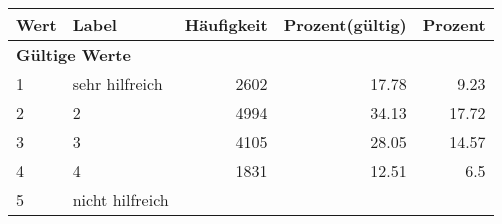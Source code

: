      \begin{longtable}{lXrrr}
     \toprule
     \textbf{Wert} & \textbf{Label} & \textbf{Häufigkeit} & \textbf{Prozent(gültig)} & \textbf{Prozent} \\
     \endhead
     \midrule
     \multicolumn{5}{l}{\textbf{Gültige Werte}}\\

     1 &
     \multicolumn{1}{X}{ sehr hilfreich   } &


       \num{2602} &
       \num[round-mode=places,round-precision=2]{17,78} &
         \num[round-mode=places,round-precision=2]{9,23} \\

     2 &
     \multicolumn{1}{X}{ 2   } &


       \num{4994} &
       \num[round-mode=places,round-precision=2]{34,13} &
         \num[round-mode=places,round-precision=2]{17,72} \\

     3 &
     \multicolumn{1}{X}{ 3   } &


       \num{4105} &
       \num[round-mode=places,round-precision=2]{28,05} &
         \num[round-mode=places,round-precision=2]{14,57} \\

     4 &
     \multicolumn{1}{X}{ 4   } &


       \num{1831} &
       \num[round-mode=places,round-precision=2]{12,51} &
         \num[round-mode=places,round-precision=2]{6,5} \\

     5 &
     \multicolumn{1}{X}{ nicht hilfreich   } &



\end{longtable}

